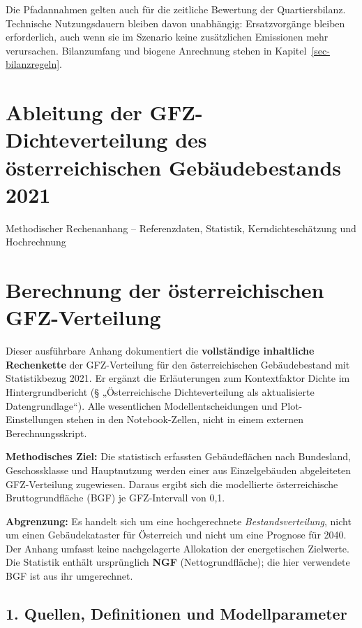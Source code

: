 \documentclass[
  ngerman,
  a4paper,
  DIV=11]{scrreprt}
\begin{document}
Die Pfadannahmen gelten auch für die zeitliche Bewertung der
Quartiersbilanz. Technische Nutzungsdauern bleiben davon unabhängig:
Ersatzvorgänge bleiben erforderlich, auch wenn sie im Szenario keine
zusätzlichen Emissionen mehr verursachen. Bilanzumfang und biogene
Anrechnung stehen in Kapitel~\ref{sec-bilanzregeln}.

\chapter{Ableitung der GFZ-Dichteverteilung des österreichischen
Gebäudebestands
2021}\label{ableitung-der-gfz-dichteverteilung-des-uxf6sterreichischen-gebuxe4udebestands-2021}

Methodischer Rechenanhang -- Referenzdaten, Statistik,
Kerndichteschätzung und Hochrechnung

\hfill\break

\chapter{Berechnung der österreichischen
GFZ-Verteilung}\label{sec-gfz-methodenanhang}

Dieser ausführbare Anhang dokumentiert die \textbf{vollständige
inhaltliche Rechenkette} der GFZ-Verteilung für den österreichischen
Gebäudebestand mit Statistikbezug 2021. Er ergänzt die Erläuterungen zum
Kontextfaktor Dichte im Hintergrundbericht (§ „Österreichische
Dichteverteilung als aktualisierte Datengrundlage``). Alle wesentlichen
Modellentscheidungen und Plot-Einstellungen stehen in den
Notebook-Zellen, nicht in einem externen Berechnungsskript.

\textbf{Methodisches Ziel:} Die statistisch erfassten Gebäudeflächen
nach Bundesland, Geschossklasse und Hauptnutzung werden einer aus
Einzelgebäuden abgeleiteten GFZ-Verteilung zugewiesen. Daraus ergibt
sich die modellierte österreichische Bruttogrundfläche (BGF) je
GFZ-Intervall von 0,1.

\textbf{Abgrenzung:} Es handelt sich um eine hochgerechnete
\emph{Bestandsverteilung}, nicht um einen Gebäudekataster für Österreich
und nicht um eine Prognose für 2040. Der Anhang umfasst keine
nachgelagerte Allokation der energetischen Zielwerte. Die Statistik
enthält ursprünglich \textbf{NGF} (Nettogrundfläche); die hier
verwendete BGF ist aus ihr umgerechnet.

\section{1. Quellen, Definitionen und
Modellparameter}\label{quellen-definitionen-und-modellparameter}
\end{document}
